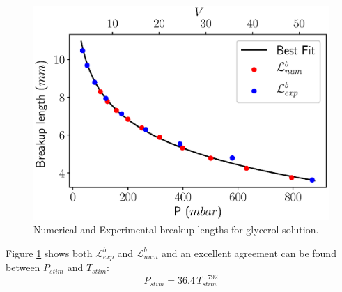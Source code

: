 \documentclass[onecolumn, 12pt]{asme2ej}
\begin{document}
\begin{figure}[h]
    \centering
    \includegraphics[width=15cm]{Figures/Fig9.eps}
    \caption{Numerical and Experimental breakup lengths for glycerol solution.}
    \label{fig:LbGlycerol}
\end{figure}

Figure \ref{fig:LbGlycerol} shows both $\mathcal{L}_{exp}^b$ and $\mathcal{L}_{num}^b$ and an excellent agreement can be found between $P_{stim}$ and $T_{stim}$:
\begin{equation}
    P_{stim} = 36.4 \, T_{stim}^{0.792}
\end{equation}
\end{document}
